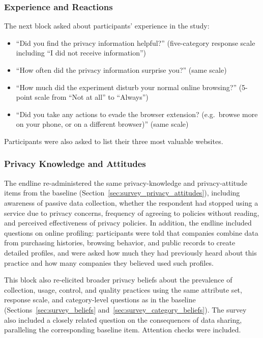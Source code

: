 \documentclass[12pt]{article}
\theoremstyle{definition}
\theoremstyle{remark}
\begin{document}
\begin{appendix}
\subsubsection{Experience and Reactions}\label{sec:survey_endline_experience}

The next block asked about participants' experience in the study:
\begin{itemize}[leftmargin=2em,itemsep=1pt]
    \item ``Did you find the privacy information helpful?'' (five-category response scale including ``I did not receive information'')
    \item ``How often did the privacy information surprise you?'' (same scale)
    \item ``How much did the experiment disturb your normal online browsing?'' (5-point scale from ``Not at all'' to ``Always'')
    \item ``Did you take any actions to evade the browser extension? (e.g.\ browse more on your phone, or on a different browser)'' (same scale)
\end{itemize}
Participants were also asked to list their three most valuable websites.

\subsubsection{Privacy Knowledge and Attitudes}\label{sec:survey_endline_knowledge}

The endline re-administered the same privacy-knowledge and privacy-attitude items from the baseline (Section~\ref{sec:survey_privacy_attitudes}), including awareness of passive data collection, whether the respondent had stopped using a service due to privacy concerns, frequency of agreeing to policies without reading, and perceived effectiveness of privacy policies. In addition, the endline included questions on online profiling: participants were told that companies combine data from purchasing histories, browsing behavior, and public records to create detailed profiles, and were asked how much they had previously heard about this practice and how many companies they believed used such profiles.

This block also re-elicited broader privacy beliefs about the prevalence of collection, usage, control, and quality practices using the same attribute set, response scale, and category-level questions as in the baseline (Sections~\ref{sec:survey_beliefs} and~\ref{sec:survey_category_beliefs}). The survey also included a closely related question on the consequences of data sharing, paralleling the corresponding baseline item. Attention checks were included.


\end{appendix}
\end{document}

